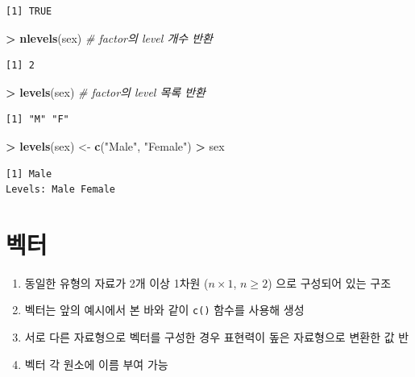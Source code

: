 \documentclass[12pt,a4paper]{book}
\newenvironment{Shaded}{\begin{snugshade}}{\end{snugshade}}
\newcommand{\KeywordTok}[1]{\textcolor[rgb]{0.13,0.29,0.53}{\textbf{#1}}}
\newcommand{\StringTok}[1]{\textcolor[rgb]{0.31,0.60,0.02}{#1}}
\newcommand{\CommentTok}[1]{\textcolor[rgb]{0.56,0.35,0.01}{\textit{#1}}}
\newcommand{\OperatorTok}[1]{\textcolor[rgb]{0.81,0.36,0.00}{\textbf{#1}}}
\newcommand{\NormalTok}[1]{#1}
\providecommand{\tightlist}{%
  \setlength{\itemsep}{0pt}\setlength{\parskip}{0pt}}
\theoremstyle{definition}
\theoremstyle{definition}
\theoremstyle{definition}
\theoremstyle{remark}
\begin{document}
\begin{verbatim}
[1] TRUE
\end{verbatim}

\begin{Shaded}
\begin{Highlighting}[]
\OperatorTok{>}\StringTok{ }\KeywordTok{nlevels}\NormalTok{(sex)  }\CommentTok{# factor의 level 개수 반환}
\end{Highlighting}
\end{Shaded}

\begin{verbatim}
[1] 2
\end{verbatim}

\begin{Shaded}
\begin{Highlighting}[]
\OperatorTok{>}\StringTok{ }\KeywordTok{levels}\NormalTok{(sex)  }\CommentTok{# factor의 level 목록 반환}
\end{Highlighting}
\end{Shaded}

\begin{verbatim}
[1] "M" "F"
\end{verbatim}

\begin{Shaded}
\begin{Highlighting}[]
\OperatorTok{>}\StringTok{ }\KeywordTok{levels}\NormalTok{(sex) <-}\StringTok{ }\KeywordTok{c}\NormalTok{(}\StringTok{"Male"}\NormalTok{, }\StringTok{"Female"}\NormalTok{)}
\OperatorTok{>}\StringTok{ }\NormalTok{sex}
\end{Highlighting}
\end{Shaded}

\begin{verbatim}
[1] Male
Levels: Male Female
\end{verbatim}

\section{벡터}

\begin{enumerate}
\def\labelenumi{\arabic{enumi}.}
\tightlist
\item
  동일한 유형의 자료가 2개 이상 1차원 (\(n \times 1\), \(n \geq 2\))
  으로 구성되어 있는 구조
\item
  벡터는 앞의 예시에서 본 바와 같이 \texttt{c()} 함수를 사용해 생성
\item
  서로 다른 자료형으로 벡터를 구성한 경우 표현력이 돞은 자료형으로
  변환한 값 반
\item
  벡터 각 원소에 이름 부여 가능
\end{enumerate}
\end{document}
